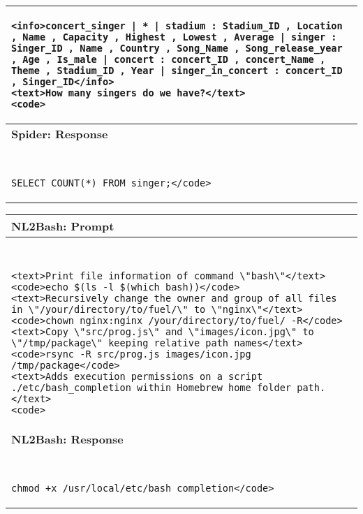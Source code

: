 \documentclass[11pt]{article}
\begin{document}
\begin{table*}[t]
\begin{tabular}{p{}}
\begin{lstlisting}
<info>concert_singer | * | stadium : Stadium_ID , Location , Name , Capacity , Highest , Lowest , Average | singer : Singer_ID , Name , Country , Song_Name , Song_release_year , Age , Is_male | concert : concert_ID , concert_Name , Theme , Stadium_ID , Year | singer_in_concert : concert_ID , Singer_ID</info>
<text>How many singers do we have?</text>
<code>
    \end{lstlisting} \\[-15pt]
    \midrule 
    \midrule
    \textbf{Spider: Response} \\
    \midrule ~\\[-22pt]
    \begin{lstlisting}
SELECT COUNT(*) FROM singer;</code>
    \end{lstlisting} \\[-15pt]
    \bottomrule
    \end{tabular}
    \caption{\label{tab:real-prompt-spider} Spider example prompt and response from Codex: following \citet{xie2022unifiedskg}, we use the concatenation of corresponding table and column names in the dataset as the extra information (i.e., \texttt{[INFO]} in Table~\ref{tab:prompt-format}).. The content in the last \texttt{<info>...</info>} and \texttt{<text>...</text>} marks in the prompt corresponds to the test problem.}
\end{table*}

\begin{table*}[t]
    \centering \small
    \begin{tabular}{p{}}
    \toprule
    \textbf{NL2Bash: Prompt} \\
    \midrule ~\\[-22pt]
    \begin{lstlisting}
<text>Print file information of command \"bash\"</text>
<code>echo $(ls -l $(which bash))</code>
<text>Recursively change the owner and group of all files in \"/your/directory/to/fuel/\" to \"nginx\"</text>
<code>chown nginx:nginx /your/directory/to/fuel/ -R</code>
<text>Copy \"src/prog.js\" and \"images/icon.jpg\" to \"/tmp/package\" keeping relative path names</text>
<code>rsync -R src/prog.js images/icon.jpg /tmp/package</code>
<text>Adds execution permissions on a script ./etc/bash_completion within Homebrew home folder path.</text>
<code>
    \end{lstlisting} \\[-15pt]
    \midrule 
    \midrule
    \textbf{NL2Bash: Response} \\
    \midrule ~\\[-22pt]
    \begin{lstlisting}
chmod +x /usr/local/etc/bash_completion</code>
    \end{lstlisting} \\[-15pt]
    \bottomrule
    \end{tabular}
    \caption{\label{tab:real-prompt-nl2bash} NL2Bash example prompt and response from Codex: we did not use any extra information. The content in the last \texttt{<text>...</text>} marks in the prompt corresponds to the test problem.}
\end{table*} 
\end{document}
